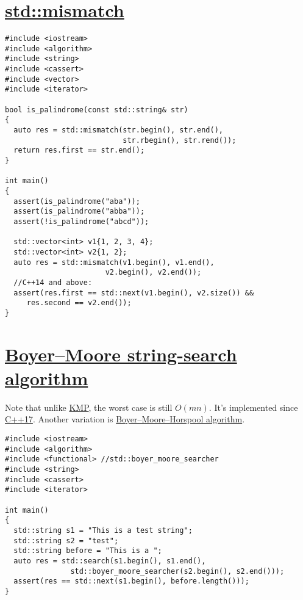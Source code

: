 \documentclass{book}
\begin{document}
	\section{\href{https://en.cppreference.com/w/cpp/algorithm/mismatch}{std::mismatch}}
	\begin{lstlisting}
#include <iostream>
#include <algorithm>
#include <string>
#include <cassert>
#include <vector>
#include <iterator>

bool is_palindrome(const std::string& str)
{
  auto res = std::mismatch(str.begin(), str.end(),
                           str.rbegin(), str.rend());
  return res.first == str.end();
}

int main()
{
  assert(is_palindrome("aba"));
  assert(is_palindrome("abba"));
  assert(!is_palindrome("abcd"));

  std::vector<int> v1{1, 2, 3, 4};
  std::vector<int> v2{1, 2};
  auto res = std::mismatch(v1.begin(), v1.end(),
	                   v2.begin(), v2.end());
  //C++14 and above:
  assert(res.first == std::next(v1.begin(), v2.size()) &&
	 res.second == v2.end());
}
	\end{lstlisting}
	\section{\href{https://en.cppreference.com/w/cpp/utility/functional/boyer_moore_searcher}{Boyer–Moore string-search algorithm}}
	Note that unlike \href{https://en.wikipedia.org/wiki/Knuth%E2%80%93Morris%E2%80%93Pratt_algorithm}{KMP}, the worst case is still $O(mn)$. It's implemented since \href{https://en.cppreference.com/w/cpp/utility/functional/boyer_moore_searcher}{C++17}. Another variation is \href{https://en.cppreference.com/w/cpp/utility/functional/boyer_moore_horspool_searcher}{Boyer–Moore–Horspool algorithm}.
	\begin{lstlisting}
#include <iostream>
#include <algorithm>
#include <functional> //std::boyer_moore_searcher
#include <string>
#include <cassert>
#include <iterator>

int main()
{
  std::string s1 = "This is a test string";
  std::string s2 = "test";
  std::string before = "This is a ";
  auto res = std::search(s1.begin(), s1.end(),
               std::boyer_moore_searcher(s2.begin(), s2.end()));
  assert(res == std::next(s1.begin(), before.length()));
}
	\end{lstlisting}
\end{document}
